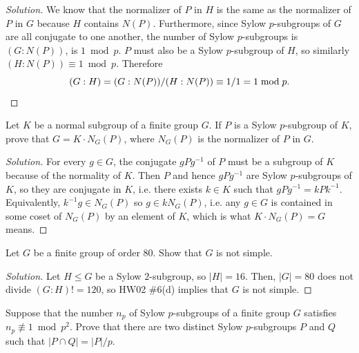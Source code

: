 \documentclass[10pt]{article}
\providecommand{\quiv}{\equiv}
\providecommand{\inv}{^{-1}}
\newenvironment{soln}{\begin{proof}[Solution]}{\end{proof}}
\providecommand{\abs}[1]{\left|#1\right|}
\begin{document}
\begin{soln}
    We know that the normalizer of $P$ in $H$
    is the same as the normalizer of $P$ in $G$ because $H$ contains $N(P)$.
    Furthermore, since Sylow $p$-subgroups of $G$
    are all conjugate to one another, the number of Sylow $p$-subgroups
    is $(G:N(P))$, is $1\bmod p$.
    $P$ must also be a Sylow $p$-subgroup of $H$, so similarly
    $(H:N(P))\quiv1\bmod p$. Therefore
    \begin{equation*}
	(G:H) = (G:N(P))/(H:N(P))\quiv 1/1 = 1\bmod p.\qedhere
    \end{equation*}
\end{soln}

\begin{problem}
    Let $K$ be a normal subgroup of a finite group $G$.
    If $P$ is a Sylow $p$-subgroup of $K$, prove that $G = K\cdot N_G(P)$,
    where $N_G(P)$ is the normalizer of $P$ in $G$.
\end{problem}

\begin{soln}
    For every $g\in G$, the conjugate $gPg\inv$ of $P$
    must be a subgroup of $K$ because of the normality of $K$.
    Then $P$ and hence $gPg\inv$ are Sylow $p$-subgroups of $K$,
    so they are conjugate in $K$, i.e. there exists $k\in K$ such that
    $gPg\inv = kPk\inv$. Equivalently, $k\inv g\in N_G(P)$
    so $g\in kN_G(P)$, i.e. any $g\in G$ is contained in
    some coset of $N_G(P)$ by an element of $K$,
    which is what $K\cdot N_G(P) = G$ means.
\end{soln}

\begin{problem}
    Let $G$ be a finite group of order $80$.
    Show that $G$ is not simple.
\end{problem}

\begin{soln}
    Let $H\le G$ be a Sylow $2$-subgroup, so $\abs H = 16$.
    Then, $\abs G = 80$ does not divide $(G:H)! = 120$,
    so HW02 \#6(d) implies that $G$ is not simple.
\end{soln}

\pagebreak

\begin{problem}
    Suppose that the number $n_p$ of Sylow $p$-subgroups
    of a finite group $G$ satisfies $n_p\not\quiv1\bmod p^2$.
    Prove that there are two distinct Sylow $p$-subgroups $P$ and $Q$
    such that $\abs{P\cap Q} = \abs P/p$.
\end{problem}
\end{document}

